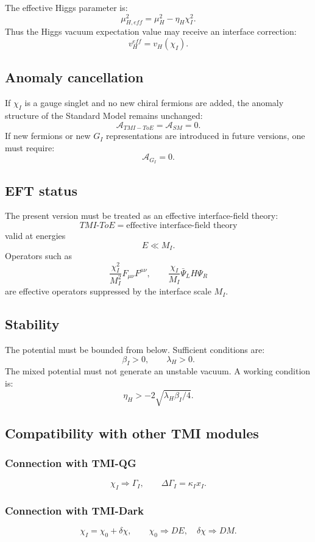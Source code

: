 \documentclass[12pt,a4paper]{article}
\begin{document}
The effective Higgs parameter is:
\[
\boxed{\mu_{H,eff}^2=\mu_H^2-\eta_H\chi_I^2}.
\]
Thus the Higgs vacuum expectation value may receive an interface correction:
\[
\boxed{v_H^{eff}=v_H(\chi_I)}.
\]

\subsection{Anomaly cancellation}

If $\chi_I$ is a gauge singlet and no new chiral fermions are added, the anomaly structure of the Standard Model remains unchanged:
\[
\boxed{\mathcal A_{TMI-ToE}=\mathcal A_{SM}=0}.
\]
If new fermions or new $G_I$ representations are introduced in future versions, one must require:
\[
\boxed{\mathcal A_{G_I}=0}.
\]

\subsection{EFT status}

The present version must be treated as an effective interface-field theory:
\[
\boxed{TMI\mbox{-}ToE=\text{effective interface-field theory}}
\]
valid at energies
\[
\boxed{E\ll M_I}.
\]
Operators such as
\[
\frac{\chi_I^2}{M_I^2}F_{\mu\nu}F^{\mu\nu},\qquad
\frac{\chi_I}{M_I}\bar\Psi_LH\Psi_R
\]
are effective operators suppressed by the interface scale $M_I$.

\subsection{Stability}

The potential must be bounded from below. Sufficient conditions are:
\[
\boxed{\beta_I>0,\qquad \lambda_H>0}.
\]
The mixed potential must not generate an unstable vacuum. A working condition is:
\[
\boxed{\eta_H>-2\sqrt{\lambda_H\beta_I/4}}.
\]

\subsection{Compatibility with other TMI modules}

\subsubsection*{Connection with TMI-QG}
\[
\boxed{\chi_I\Rightarrow\Gamma_I},\qquad
\boxed{\Delta\Gamma_I=\kappa_Ix_I}.
\]

\subsubsection*{Connection with TMI-Dark}
\[
\boxed{\chi_I=\chi_0+\delta\chi},\qquad
\boxed{\chi_0\Rightarrow DE,\quad \delta\chi\Rightarrow DM}.
\]
\end{document}
